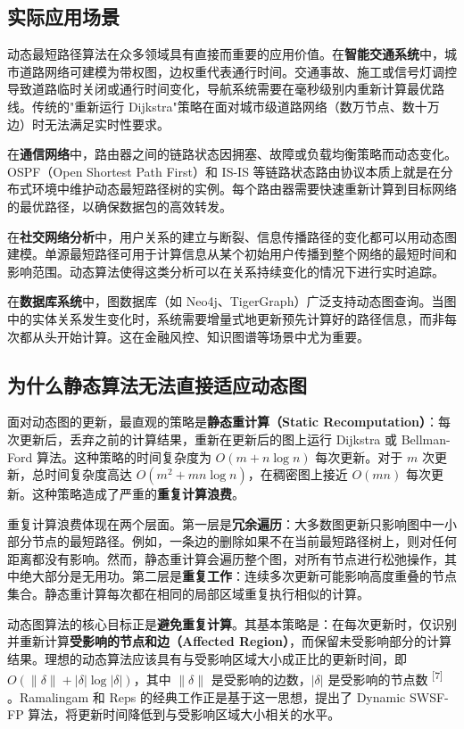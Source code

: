 \documentclass[12pt,a4paper]{ctexart}
\begin{document}
\subsection{实际应用场景}

动态最短路径算法在众多领域具有直接而重要的应用价值。在\textbf{智能交通系统}中，城市道路网络可建模为带权图，边权重代表通行时间。交通事故、施工或信号灯调控导致道路临时关闭或通行时间变化，导航系统需要在毫秒级别内重新计算最优路线。传统的"重新运行 Dijkstra"策略在面对城市级道路网络（数万节点、数十万边）时无法满足实时性要求。

在\textbf{通信网络}中，路由器之间的链路状态因拥塞、故障或负载均衡策略而动态变化。OSPF（Open Shortest Path First）和 IS-IS 等链路状态路由协议本质上就是在分布式环境中维护动态最短路径树的实例。每个路由器需要快速重新计算到目标网络的最优路径，以确保数据包的高效转发。

在\textbf{社交网络分析}中，用户关系的建立与断裂、信息传播路径的变化都可以用动态图建模。单源最短路径可用于计算信息从某个初始用户传播到整个网络的最短时间和影响范围。动态算法使得这类分析可以在关系持续变化的情况下进行实时追踪。

在\textbf{数据库系统}中，图数据库（如 Neo4j、TigerGraph）广泛支持动态图查询。当图中的实体关系发生变化时，系统需要增量式地更新预先计算好的路径信息，而非每次都从头开始计算。这在金融风控、知识图谱等场景中尤为重要。

\subsection{为什么静态算法无法直接适应动态图}

面对动态图的更新，最直观的策略是\textbf{静态重计算（Static Recomputation）}：每次更新后，丢弃之前的计算结果，重新在更新后的图上运行 Dijkstra 或 Bellman-Ford 算法。这种策略的时间复杂度为 $O(m+n\log n)$ 每次更新。对于 $m$ 次更新，总时间复杂度高达 $O(m^2+mn\log n)$，在稠密图上接近 $O(mn)$ 每次更新。这种策略造成了严重的\textbf{重复计算浪费}。

重复计算浪费体现在两个层面。第一层是\textbf{冗余遍历}：大多数图更新只影响图中一小部分节点的最短路径。例如，一条边的删除如果不在当前最短路径树上，则对任何距离都没有影响。然而，静态重计算会遍历整个图，对所有节点进行松弛操作，其中绝大部分是无用功。第二层是\textbf{重复工作}：连续多次更新可能影响高度重叠的节点集合。静态重计算每次都在相同的局部区域重复执行相似的计算。

动态图算法的核心目标正是\textbf{避免重复计算}。其基本策略是：在每次更新时，仅识别并重新计算\textbf{受影响的节点和边（Affected Region）}，而保留未受影响部分的计算结果。理想的动态算法应该具有与受影响区域大小成正比的更新时间，即 $O(\|\delta\|+|\delta|\log|\delta|)$，其中 $\|\delta\|$ 是受影响的边数，$|\delta|$ 是受影响的节点数 \textsuperscript{[7]} 。Ramalingam 和 Reps 的经典工作正是基于这一思想，提出了 Dynamic SWSF-FP 算法，将更新时间降低到与受影响区域大小相关的水平。
\end{document}
